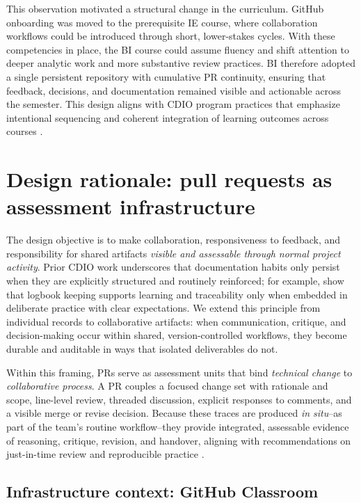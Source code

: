 This observation motivated a structural change in the curriculum. GitHub onboarding was moved to the prerequisite IE course, where collaboration workflows could be introduced through short, lower-stakes cycles. With these competencies in place, the BI course could assume fluency and shift attention to deeper analytic work and more substantive review practices. BI therefore adopted a single persistent repository with cumulative PR continuity, ensuring that feedback, decisions, and documentation remained visible and actionable across the semester. This design aligns with CDIO program practices that emphasize intentional sequencing and coherent integration of learning outcomes across courses \parencite{malmqvist2006integrated}.


\section{Design rationale: pull requests as assessment infrastructure}
The design objective is to make collaboration, responsiveness to feedback, and responsibility for shared artifacts \emph{visible and assessable through normal project activity}. Prior CDIO work underscores that documentation habits only persist when they are explicitly structured and routinely reinforced; for example, \textcite{junaid2018logbook} show that logbook keeping supports learning and traceability only when embedded in deliberate practice with clear expectations. We extend this principle from individual records to collaborative artifacts: when communication, critique, and decision-making occur within shared, version-controlled workflows, they become durable and auditable in ways that isolated deliverables do not.

Within this framing, PRs serve as assessment units that bind \emph{technical change} to \emph{collaborative process}. A PR couples a focused change set with rationale and scope, line-level review, threaded discussion, explicit responses to comments, and a visible merge or revise decision. Because these traces are produced \emph{in situ}--as part of the team’s routine workflow--they provide integrated, assessable evidence of reasoning, critique, revision, and handover, aligning with recommendations on just-in-time review and reproducible practice \parencite{PetreWilson2014WSSSPE,Wilson2017GoodEnough}.

\subsection{Infrastructure context: GitHub Classroom}

